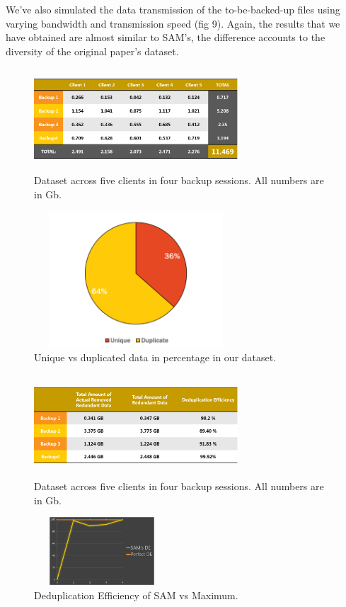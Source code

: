 \documentclass[journal]{IEEEtran}
\begin{document}
We've also simulated the data transmission of the to-be-backed-up files using varying bandwidth and transmission speed (fig 9). Again, the results that we have obtained are almost similar to SAM's, the difference accounts to the diversity of the original paper's dataset.

\begin{figure}[!t]
\centering
\includegraphics[height=1.5in, width=3in]{image2.png}
\caption{Dataset across five clients in four backup sessions. All numbers are in Gb.}
\end{figure}

\begin{figure}[!t]
\centering
\includegraphics[height=2in, width=3in]{image4.png}
\caption{Unique vs duplicated data in percentage in our dataset.}
\end{figure}

\begin{figure}[!t]
\centering
\includegraphics[height=1.5in, width=3in]{image5.png}
\caption{Dataset across five clients in four backup sessions. All numbers are in Gb.}
\end{figure}

\begin{figure}[!t]
\centering
\includegraphics[height=1in, width=2in]{image7.png}
\caption{Deduplication Efficiency of SAM vs Maximum.}
\end{figure}
\end{document}
